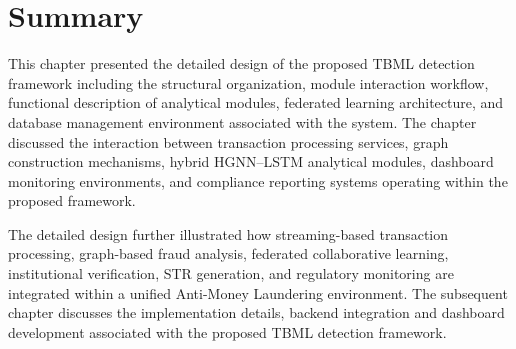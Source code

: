 \section[Summary]{\textbf{Summary}}

This chapter presented the detailed design of the proposed TBML detection framework including the structural organization, module interaction workflow, functional description of analytical modules, federated learning architecture, and database management environment associated with the system. The chapter discussed the interaction between transaction processing services, graph construction mechanisms, hybrid HGNN--LSTM analytical modules, dashboard monitoring environments, and compliance reporting systems operating within the proposed framework.

The detailed design further illustrated how streaming-based transaction processing, graph-based fraud analysis, federated collaborative learning, institutional verification, STR generation, and regulatory monitoring are integrated within a unified Anti-Money Laundering environment. The subsequent chapter discusses the implementation details, backend integration and dashboard development associated with the proposed TBML detection framework.